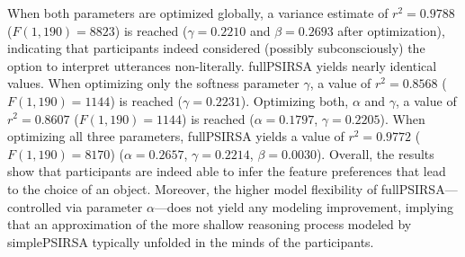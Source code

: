 \documentclass[10pt,a4paper]{article}
\begin{document}
When both parameters are optimized globally, a variance estimate of $r^2 = 0.9788$ ($F(1,190) = 8823$) is reached
($\gamma=0.2210$ and $\beta=0.2693$ after optimization), indicating that participants indeed considered (possibly subconsciously) the option to interpret utterances non-literally. 
fullPSIRSA yields nearly identical values.
When optimizing only the softness parameter $\gamma$, a value of $r^2 = 0.8568$ ($F(1, 190) = 1144$) is reached ($\gamma=0.2231$).
Optimizing both, $\alpha$ and $\gamma$, a value of $r^2 = 0.8607$ ($F(1, 190) = 1144$) is reached ($\alpha=0.1797$, $\gamma=0.2205$).
When optimizing all three parameters, fullPSIRSA yields a value of $r^2 = 0.9772$ ($F(1, 190) = 8170$) ($\alpha=0.2657$, $\gamma=0.2214$, $\beta=0.0030$).
Overall, the results show that participants are indeed able to infer the feature preferences that lead to the choice of an object.%
Moreover, the higher model flexibility of fullPSIRSA---controlled via parameter $\alpha$---does not yield any modeling improvement, implying that an approximation of the more shallow reasoning process modeled by simplePSIRSA typically unfolded in the minds of the participants.  

\end{document}
